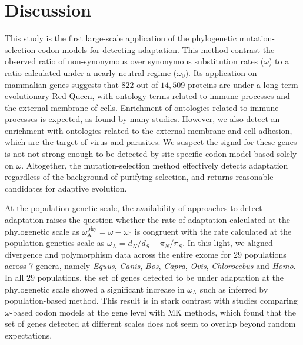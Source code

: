 \documentclass{article}
\newcommand{\dn}{d_N}
\newcommand{\ds}{d_S}
\newcommand{\dnds}{\dn / \ds}
\newcommand{\pn}{\pi_N}
\newcommand{\ps}{\pi_S}
\newcommand{\pnps}{\pn / \ps}
\begin{document}
    \section*{Discussion}\label{sec:discussion}

    This study is the first large-scale application of the phylogenetic mutation-selection codon models for detecting adaptation.
    This method contrast the observed ratio of non-synonymous over synonymous substitution rates ($\omega$) to a ratio calculated under a nearly-neutral regime ($\omega_{0}$).
    Its application on mammalian genes suggests that $822$ out of $14,509$ proteins are under a long-term evolutionary Red-Queen, with ontology terms related to immune processes and the external membrane of cells.
    Enrichment of ontologies related to immune processes is expected, as found by many studies\cite{kosiol_patterns_2008, enard_viruses_2016, ebel_high_2017}.
    However, we also detect an enrichment with ontologies related to the external membrane and cell adhesion, which are the target of virus and parasites.
    We suspect the signal for these genes is not not strong enough to be detected by site-specific codon model based solely on $\omega$.
    Altogether, the mutation-selection method effectively detects adaptation regardless of the background of purifying selection, and returns reasonable candidates for adaptive evolution.

    At the population-genetic scale, the availability of approaches to detect adaptation\cite{mcdonald_adaptative_1991, messer_frequent_2013} raises the question whether the rate of adaptation calculated at the phylogenetic scale as $\omega_{\mathrm{A}}^{\mathrm{phy}} = \omega - \omega_{0}$ is congruent with the rate calculated at the population genetics scale as $\omega_{\mathrm{A}} = \dnds - \pnps$.
    In this light, we aligned divergence and polymorphism data across the entire exome for 29 populations across 7 genera, namely \textit{Equus}, \textit{Canis}, \textit{Bos}, \textit{Capra}, \textit{Ovis}, \textit{Chlorocebus} and \textit{Homo}.
    In all $29$ populations, the set of genes detected to be under adaptation at the phylogenetic scale showed a significant increase in $\omega_{\mathrm{A}}$ such as inferred by population-based method.
    This result is in stark contrast with studies comparing $\omega$-based codon models at the gene level with MK methods, which found that the set of genes detected at different scales does not seem to overlap beyond random expectations\cite{chen_two_2021}.
\end{document}
